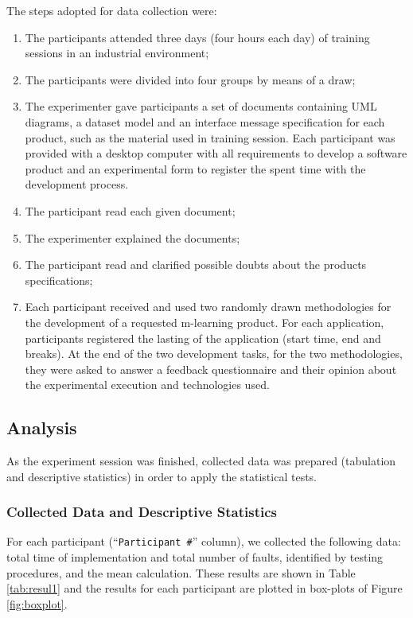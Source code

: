The steps adopted for data collection were:

\begin{enumerate}

\item The participants attended three days (four hours each day) of training sessions in an industrial environment;

\item The participants were divided into four groups by means of a draw;

\item The experimenter gave participants a set of documents containing UML diagrams, a dataset model and an interface message specification for each product, such as the material used in training session. Each participant was provided with a desktop computer with all requirements to develop a software product and an experimental form to register the spent time with the development process.
\item The participant read each given document;
\item The experimenter explained the documents;
\item The participant read and clarified possible doubts about the products specifications;
\item Each participant received and used two randomly drawn methodologies for the development of a requested m-learning product. For each application, participants registered the lasting of the application (start time, end and breaks). At the end of the two development tasks, for the two methodologies, they were asked to answer a feedback questionnaire and their opinion about the experimental execution and technologies used.
\end{enumerate}

\subsection{Analysis}\label{sub:analysis}

As the experiment session was finished, collected data was prepared (tabulation and descriptive statistics) in order to apply the statistical tests.

\subsubsection{Collected Data and Descriptive Statistics}

For each participant (``\texttt{Participant \#}'' column), we collected the following data: total time of implementation and total number of faults, identified by testing procedures, and the mean calculation. These results are shown in Table \ref{tab:resul1} and the results for each participant are plotted in box-plots of Figure \ref{fig:boxplot}. 

